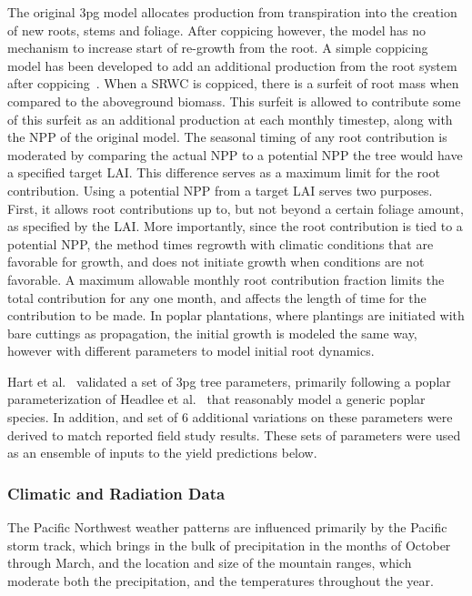 \documentclass[preprint,12pt]{elsarticle}
\begin{document}
The original \ac{3pg} model allocates production from transpiration
into the creation of new roots, stems and foliage.  After coppicing
however, the model has no mechanism to increase start of re-growth
from the root.  A simple coppicing model has been developed to add an
additional production from the root system after
coppicing~\cite{Hart2014}.  When a \ac{SRWC} is coppiced, there is a
surfeit of root mass when compared to the aboveground biomass.  This
surfeit is allowed to contribute some of this surfeit as an additional
production at each monthly timestep, along with the \ac{NPP} of the
original model.  The seasonal timing of any root contribution is
moderated by comparing the actual \ac{NPP} to a potential \ac{NPP} the
tree would have a specified target \ac{LAI}.  This difference serves
as a maximum limit for the root contribution.  Using a potential
\ac{NPP} from a target \ac{LAI} serves two purposes. First, it allows
root contributions up to, but not beyond a certain foliage amount, as
specified by the \ac{LAI}.  More importantly, since the root
contribution is tied to a potential \ac{NPP}, the method times
regrowth with climatic conditions that are favorable for growth, and
does not initiate growth when conditions are not favorable.  A maximum
allowable monthly root contribution fraction limits the total
contribution for any one month, and affects the length of time for
the contribution to be made.  In poplar plantations, where plantings
are initiated with bare cuttings as propagation, the initial growth
is modeled the same way, however with different parameters to model
initial root dynamics.

Hart et al.~\cite{Hart2014} validated a set of \ac{3pg} tree
parameters, primarily following a poplar parameterization of Headlee
et al.~\cite{Headlee2012} that reasonably model a generic poplar
species.  In addition, and set of 6 additional variations on these
parameters were derived to match reported field study results.  These
sets of parameters were used as an ensemble of inputs to the yield
predictions below.

\subsubsection{Climatic and Radiation Data}
\label{sec:climate}


The Pacific Northwest weather patterns are influenced primarily by the
Pacific storm track, which brings in the bulk of precipitation in the
months of October through March, and the location and size of the
mountain ranges, which moderate both the precipitation, and the
temperatures throughout the year.
\end{document}
